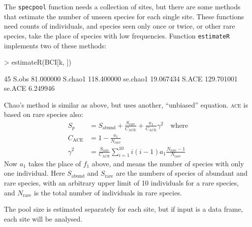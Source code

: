 \documentclass[a4paper,10pt]{amsart}
\begin{document}
The \texttt{specpool} function needs a collection of sites, but there
are some methods that estimate the number of unseen species for each
single site.  These functions need counts of individuals, and species
seen only once or twice, or other rare species, take the place of
species with low frequencies.  Function \texttt{estimateR} implements
two of these methods:
\begin{Schunk}
\begin{Sinput}
> estimateR(BCI[k, ])
\end{Sinput}
\begin{Soutput}
                 45
S.obs     81.000000
S.chao1  118.400000
se.chao1  19.067434
S.ACE    129.701001
se.ACE     6.249946
\end{Soutput}
\end{Schunk}
Chao's method is similar as above, but uses another, ``unbiased''
equation. \textsc{ace} is based on rare species also:
\begin{equation}
\begin{split}
S_p &= S_\mathrm{abund} + \frac{S_\mathrm{rare}}{C_\mathrm{ACE}} +
\frac{a_1}{C_\mathrm{ACE}} \gamma^2 \quad \text{where}\\
C_\mathrm{ACE} &= 1 - \frac{a_1}{N_\mathrm{rare}}\\
\gamma^2 &= \frac{S_\mathrm{rare}}{C_\mathrm{ACE}} \sum_{i=1}^{10} i
(i-1) a_1 \frac{N_\mathrm{rare} - 1}{N_\mathrm{rare}}
\end{split}
\end{equation}
Now $a_1$ takes the place of $f_1$ above, and means the number of
species with only one individual.
Here $S_\mathrm{abund}$ and $S_\mathrm{rare}$ are the numbers of
species of abundant and rare species, with an arbitrary upper limit of
10 individuals for a rare species, and $N_\mathrm{rare}$ is the total
number of individuals in rare species.

The pool size
is estimated separately for each site, but if input is a data frame,
each site will be analysed.
\end{document}
